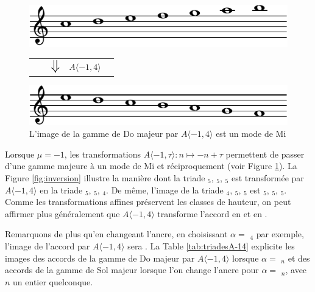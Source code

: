 \documentclass{article}
\begin{document}
\begin{figure}
  \includegraphics[width=\columnwidth]{c-maj-crop.pdf}
  \begin{tabularx}{\columnwidth}{ YYYYZ }
    &&$ \mathlarger{\mathlarger{\mathlarger{\mathlarger\Downarrow}}}$ & $A\langle -1,4 \rangle$&
    \end{tabularx}
  \includegraphics[width=\columnwidth]{e-mod-crop.pdf}
  \caption{L'image de la gamme de Do majeur par $A\langle -1,4 \rangle$ est un mode de Mi}
  \label{fig:modeE}
\end{figure}

Lorsque $\mu = -1$, les transformations $A \langle -1,\tau\rangle : n\mapsto -n + \tau$ permettent de passer d'une gamme majeure à un mode de Mi et réciproquement (voir Figure \ref{fig:modeE}). La Figure \ref{fig:inversion} illustre la manière dont la triade $_5$, $_5$, $_5$ est transformée par $A\langle -1,4 \rangle$ en la triade $_5$, $_5$, $_4$. De même, l'image de la triade $_4$, $_5$, $_5$  est  $_5$, $_5$, $_5$. Comme les transformations affines préservent les classes de hauteur, on peut affirmer plus généralement que $A \langle -1,4\rangle$ transforme l'accord  en  et  en .

Remarquons de plus qu'en changeant l'ancre,  en choisissant $\alpha =$  $_4$ par exemple, l'image de l'accord  par $A\langle-1,4 \rangle$ sera . La Table \ref{tab:triadesA-14} explicite les images des accords de la gamme de Do majeur par $A\langle -1,4 \rangle$ lorsque $\alpha = $ $_n$ et des accords de la gamme de Sol majeur lorsque l'on change l'ancre pour $\alpha =$ $_n$, avec $n$ un entier quelconque.
\end{document}
